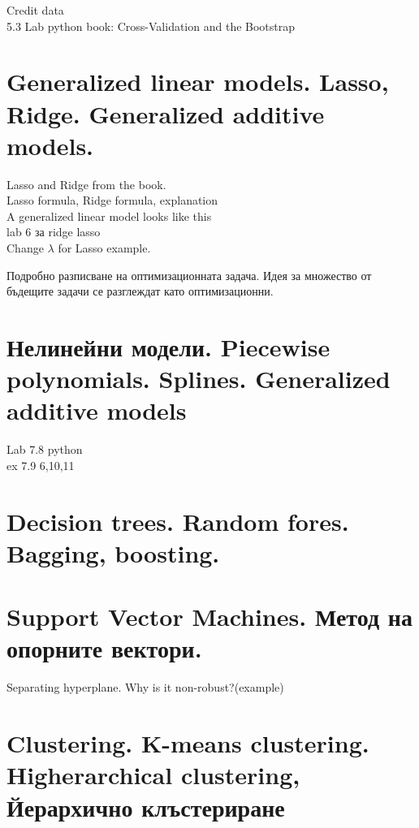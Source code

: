 \documentclass{article}
\begin{document}
	
	Credit data\\
	
	5.3 Lab python book: Cross-Validation and the Bootstrap \\
	
\newpage
\section{Generalized linear models. Lasso, Ridge. Generalized additive models. }



	Lasso and Ridge from the book.\\
	Lasso formula, Ridge formula, explanation \\
	
	
	A generalized linear model looks like this\\
	lab 6 за ridge lasso \\
	Change $\lambda$ for Lasso example.
	
	
	
	Подробно разписване на оптимизационната задача. Идея за множество от бъдещите задачи
	се разглеждат като оптимизационни.
	
\newpage	
\section{Нелинейни модели. Piecewise polynomials. Splines. Generalized additive models }
Lab 7.8 python \\
ex 7.9 6,10,11
	
	
	
\newpage	
\section{Decision trees. Random fores. Bagging, boosting.}
	
\newpage
\section{Support Vector Machines. Метод на опорните вектори.}	
Separating hyperplane. Why is it non-robust?(example) \\

	
	
	
\newpage
\section{Clustering. K-means clustering. Higherarchical clustering, Йерархично клъстериране}	
\end{document}
